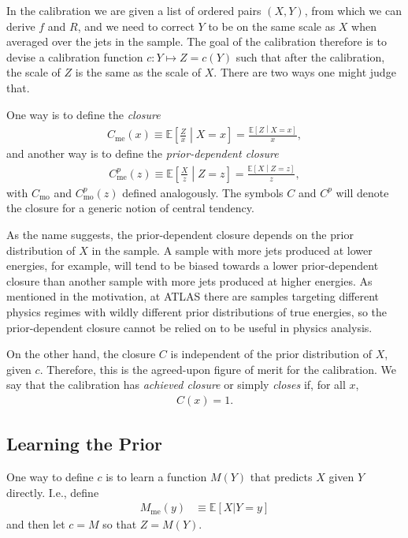 In the calibration we are given a list of ordered pairs $(X,Y)$, from which we can derive $f$ and $R$, and we need to correct $Y$ to be on the same scale as $X$ when averaged over the jets in the sample.
The goal of the calibration therefore is to devise a calibration function $c: Y\mapsto Z=c(Y)$ such that after the calibration, the scale of $Z$ is the same as the scale of $X$.
There are two ways one might judge that.

One way is to define the \textit{closure}
\begin{align}
  C_\text{me}(x) \equiv \mathbb{E}\left[\frac{Z}{x}\middle| X=x\right] = \frac{\mathbb{E}\left[Z\middle| X=x\right]}{x}
\label{eqn:NI:closure},
\end{align}
and another way is to define the \textit{prior-dependent closure}
\begin{align}
  C^p_\text{me}(z) \equiv \mathbb{E}\left[\frac{X}{z}\middle| Z=z\right] = \frac{\mathbb{E}\left[X\middle| Z=z\right]}{z}
\label{eqn:NI:closure_priordependent},
\end{align}
with $C_\text{mo}$ and $C^p_\text{mo}(z)$ defined analogously.
The symbols $C$ and $C^p$ will denote the closure for a generic notion of central tendency.

As the name suggests, the prior-dependent closure depends on the prior distribution of $X$ in the sample.
A sample with more jets produced at lower energies, for example, will tend to be biased towards a lower prior-dependent closure than another sample with more jets produced at higher energies.
As mentioned in the motivation, at ATLAS there are samples targeting different physics regimes with wildly different prior distributions of true energies, so the prior-dependent closure cannot be relied on to be useful in physics analysis.

On the other hand, the closure $C$ is independent of the prior distribution of $X$, given $c$.
Therefore, this is the agreed-upon figure of merit for the calibration.
We say that the calibration has {\it achieved closure} or simply {\it closes} if, for all $x$,
\begin{align}
  C(x) = 1.
\end{align}

\subsection{Learning the Prior}
\label{sec:NI:learningprior}
One way to define $c$ is to learn a function $M(Y)$ that predicts $X$ given $Y$ directly.
I.e., define
\begin{align}
M_\text{me}(y)&\equiv\mathbb{E}[X|Y=y]
\end{align}
and then let $c=M$ so that $Z=M(Y)$.

